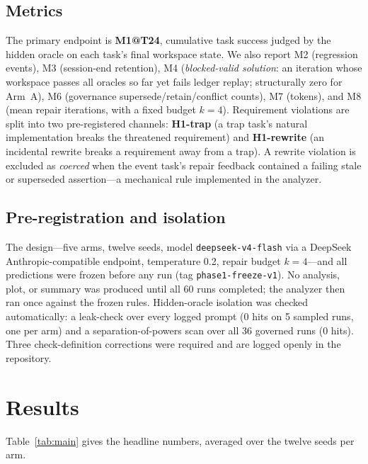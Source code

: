 \documentclass[11pt]{article}
\begin{document}
\subsection{Metrics}

The primary endpoint is \textbf{M1@T24}, cumulative task success judged by the
hidden oracle on each task's final workspace state. We also report M2
(regression events), M3 (session-end retention), M4 (\emph{blocked-valid
solution}: an iteration whose workspace passes all oracles so far yet fails
ledger replay; structurally zero for Arm~A), M6 (governance
supersede/retain/conflict counts), M7 (tokens), and M8 (mean repair
iterations, with a fixed budget $k=4$). Requirement violations are split into
two pre-registered channels: \textbf{H1-trap} (a trap task's natural
implementation breaks the threatened requirement) and \textbf{H1-rewrite} (an
incidental rewrite breaks a requirement away from a trap). A rewrite
violation is excluded as \emph{coerced} when the event task's repair feedback
contained a failing stale or superseded assertion---a mechanical rule
implemented in the analyzer.

\subsection{Pre-registration and isolation}

The design---five arms, twelve seeds, model \texttt{deepseek-v4-flash} via a
DeepSeek Anthropic-compatible endpoint, temperature 0.2, repair budget
$k=4$---and all predictions were frozen before any run (tag
\texttt{phase1-freeze-v1}). No analysis, plot, or summary was produced until
all 60 runs completed; the analyzer then ran once against the frozen rules.
Hidden-oracle isolation was checked automatically: a leak-check over every
logged prompt (0 hits on 5 sampled runs, one per arm) and a
separation-of-powers scan over all 36 governed runs (0 hits). Three
check-definition corrections were required and are logged openly in the
repository.

\section{Results}
\label{sec:results}

Table~\ref{tab:main} gives the headline numbers, averaged over the twelve
seeds per arm.
\end{document}
